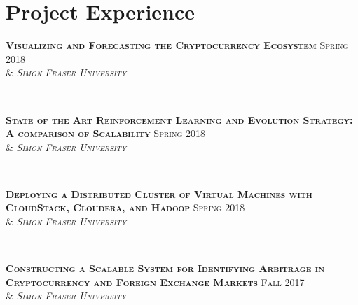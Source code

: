 \documentclass[10pt]{article} %
\begin{document}
\begin{minipage}[t]{0.43\textwidth}

\section{Project Experience} 

{\raggedright\textsc{\textbf{Visualizing and Forecasting the Cryptocurrency Ecosystem}  \hfill Spring 2018\\
& \textit{Simon Fraser University}}} \\
\vspace{4mm} 


{\raggedright\textsc{\textbf{State of the Art Reinforcement Learning and Evolution Strategy: A comparison of Scalability}  \hfill Spring 2018\\
& \textit{Simon Fraser University}}} \\
\vspace{4mm} 


{\raggedright\textsc{\textbf{Deploying a Distributed Cluster of Virtual Machines with CloudStack, Cloudera, and Hadoop}  \hfill Spring 2018\\
& \textit{Simon Fraser University}}} \\
\vspace{4mm} 


{\raggedright\textsc{\textbf{Constructing a Scalable System for Identifying Arbitrage in Cryptocurrency and Foreign Exchange Markets} \hfill Fall 2017\\
& \textit{Simon Fraser University}}} \\
\vspace{4mm} 



\end{minipage}
\end{document}
